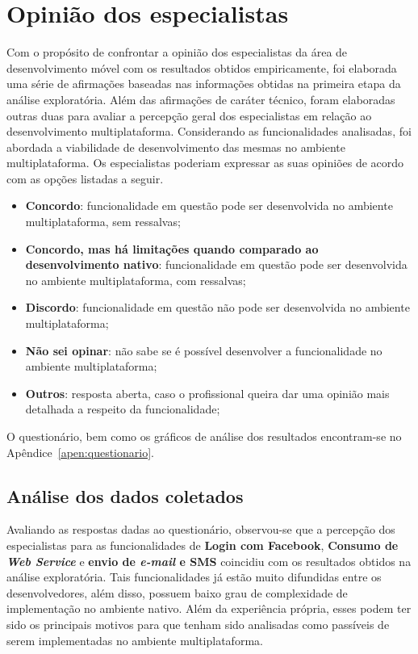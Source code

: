 \section{Opinião dos especialistas} \label{sec:questionario}
Com o propósito de confrontar a opinião dos especialistas da área de desenvolvimento móvel com os resultados obtidos empiricamente, foi elaborada uma série de afirmações baseadas 
nas informações obtidas na primeira etapa da análise exploratória. Além das afirmações de caráter técnico, foram elaboradas outras duas para avaliar a percepção geral dos especialistas em relação ao desenvolvimento 
multiplataforma. Considerando as funcionalidades analisadas, foi abordada a viabilidade de desenvolvimento das mesmas no ambiente multiplataforma. Os especialistas poderiam expressar as suas opiniões de acordo com as 
opções listadas a seguir.

\begin{itemize}
	\item \textbf{Concordo}: funcionalidade em questão pode ser desenvolvida no ambiente multiplataforma, sem ressalvas;
	\item \textbf{Concordo, mas há limitações quando comparado ao desenvolvimento nativo}: funcionalidade em questão pode ser desenvolvida no ambiente multiplataforma, com ressalvas;
	\item \textbf{Discordo}: funcionalidade em questão não pode ser desenvolvida no ambiente multiplataforma;
	\item \textbf{Não sei opinar}: não sabe se é possível desenvolver a funcionalidade no ambiente multiplataforma;
	\item \textbf{Outros}: resposta aberta, caso o profissional queira dar uma opinião mais detalhada a respeito da funcionalidade; 
\end{itemize}

O questionário, bem como os gráficos de análise dos resultados encontram-se no Apêndice~\ref{apen:questionario}.

\subsection{Análise dos dados coletados} \label{subsec:analisedadosquestionario}
Avaliando as respostas dadas ao questionário, observou-se que a percepção dos especialistas para as funcionalidades de \textbf{Login com Facebook}, \textbf{Consumo de \textit{Web Service}} e \textbf{envio de \textit{e-mail} e SMS}
coincidiu com os resultados obtidos na análise exploratória. Tais funcionalidades já estão muito difundidas entre os desenvolvedores, além disso, possuem baixo grau de complexidade de implementação no ambiente nativo. 
Além da experiência própria, esses podem ter sido os principais motivos para que tenham sido analisadas como passíveis de serem implementadas no ambiente multiplataforma.

